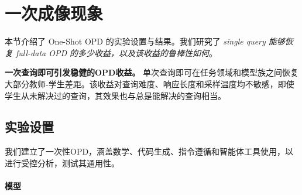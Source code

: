 \section{一次成像现象}
\label{sec:one-shot}

本节介绍了 One-Shot OPD 的实验设置与结果。我们研究了 \textit{single query 能够恢复 full-data OPD 的多少收益，以及该收益的鲁棒性如何}。

\begin{tcolorbox}[takeawaysbox]
\textbf{一次查询即可引发稳健的OPD收益。}
单次查询即可在任务领域和模型族之间恢复大部分教师-学生差距。该收益对查询难度、响应长度和采样温度均不敏感，即使学生从未解决过的查询，其效果也与总是能解决的查询相当。
\end{tcolorbox}

\subsection{实验设置}
\label{sec:setup}

我们建立了一次性OPD，涵盖数学、代码生成、指令遵循和智能体工具使用，以进行受控分析，测试其通用性。

\paragraph{模型}

